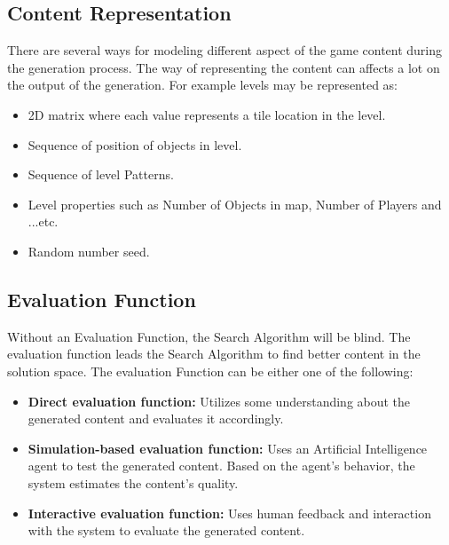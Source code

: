 \subsection{Content Representation}
There are several ways for modeling different aspect of the game content during the generation process. The way of representing the content can affects a lot on the output of the generation. For example levels may be represented as:\cite{pcgBookSearch}
\begin{itemize}\itemsep0pt \parskip0pt 
	\item 2D matrix where each value represents a tile location in the level.
	\item Sequence of position of objects in level.
	\item Sequence of level Patterns.
	\item Level properties such as Number of Objects in map, Number of Players and ...etc.
	\item Random number seed.
\end{itemize}

\subsection{Evaluation Function}
Without an Evaluation Function, the Search Algorithm will be blind. The evaluation function leads the Search Algorithm to find better content in the solution space. The evaluation Function can be either one of the following:\cite{pcgBookSearch}
\begin{itemize}\itemsep0pt \parskip0pt 
	\item \textbf{Direct evaluation function:} Utilizes some understanding about the generated content and evaluates it accordingly.
	\item \textbf{Simulation-based evaluation function:} Uses an Artificial Intelligence agent to test the generated content. Based on the agent's behavior, the system estimates the content's quality.
	\item \textbf{Interactive evaluation function:} Uses human feedback and interaction with the system to evaluate the generated content.
\end{itemize}

